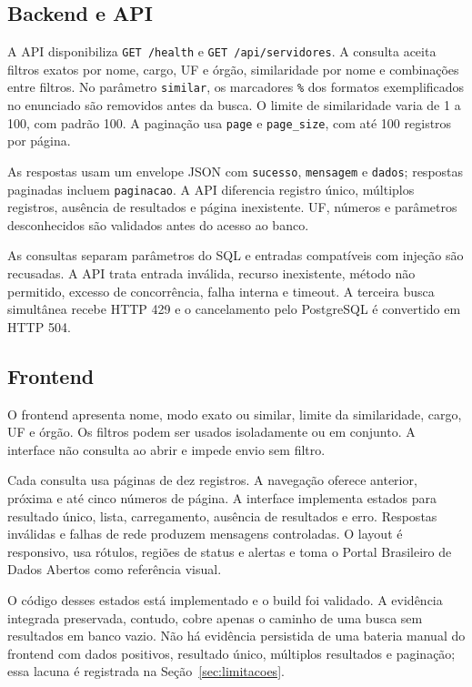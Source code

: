 \documentclass[12pt]{article}
\newcommand{\code}[1]{\texttt{#1}}
\begin{document}
\subsection{Backend e API}

A API disponibiliza \code{GET /health} e \code{GET /api/servidores}. A consulta
aceita filtros exatos por nome, cargo, UF e órgão, similaridade por nome e
combinações entre filtros. No parâmetro \code{similar}, os marcadores
\code{\%} dos formatos exemplificados no enunciado são removidos antes da
busca. O limite de similaridade varia de 1 a 100, com padrão 100. A paginação
usa \code{page} e \code{page\_size}, com até 100 registros por página.

As respostas usam um envelope JSON com \code{sucesso}, \code{mensagem} e
\code{dados}; respostas paginadas incluem \code{paginacao}. A API diferencia
registro único, múltiplos registros, ausência de resultados e página
inexistente. UF, números e parâmetros desconhecidos são validados antes do
acesso ao banco.

As consultas separam parâmetros do SQL e entradas compatíveis com injeção são
recusadas. A API trata entrada inválida, recurso inexistente, método não
permitido, excesso de concorrência, falha interna e timeout. A terceira busca
simultânea recebe HTTP 429 e o cancelamento pelo PostgreSQL é convertido em
HTTP 504.

\subsection{Frontend}

O frontend apresenta nome, modo exato ou similar, limite da similaridade,
cargo, UF e órgão. Os filtros podem ser usados isoladamente ou em conjunto. A
interface não consulta ao abrir e impede envio sem filtro.

Cada consulta usa páginas de dez registros. A navegação oferece anterior,
próxima e até cinco números de página. A interface implementa estados para
resultado único, lista, carregamento, ausência de resultados e erro. Respostas
inválidas e falhas de rede produzem mensagens controladas. O layout é
responsivo, usa rótulos, regiões de status e alertas e toma o Portal Brasileiro
de Dados Abertos como referência visual.

O código desses estados está implementado e o build foi validado. A evidência
integrada preservada, contudo, cobre apenas o caminho de uma busca sem
resultados em banco vazio. Não há evidência persistida de uma bateria manual do
frontend com dados positivos, resultado único, múltiplos resultados e
paginação; essa lacuna é registrada na Seção~\ref{sec:limitacoes}.
\end{document}
